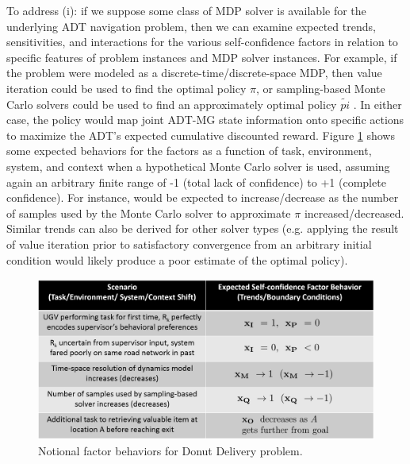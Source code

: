 To address (i): if we suppose some class of MDP solver is available for the underlying ADT navigation problem, then we can examine expected trends, sensitivities, and interactions for the various self-confidence factors in relation to specific features of problem instances and MDP solver instances. 
For example, if the problem were modeled  as a discrete-time/discrete-space MDP, then value iteration could be used to find the optimal policy $\pi$, or sampling-based Monte Carlo solvers could be used to find an approximately optimal policy $\tilde{pi}$ \cite{Browne2012-lj}. In either case, the policy would map joint ADT-MG state information onto specific actions to maximize the ADT's expected cumulative discounted reward.  
Figure \ref{fig:trendsBCs} shows some expected behaviors for the \famsec{} factors as a function of task, environment, system, and context when a hypothetical Monte Carlo solver is used, assuming again an arbitrary finite range of -1 (total lack of confidence) to +1 (complete confidence). For instance, \xQ{} would be expected to increase/decrease as the number of samples used by the Monte Carlo solver to approximate $\pi$ increased/decreased. Similar trends can also be derived for other solver types (e.g. applying the result of value iteration prior to satisfactory convergence from an arbitrary initial condition would likely produce a poor estimate of the optimal policy). %
\begin{figure}[tbp]
    \centering
    \includegraphics[width=0.65\linewidth]{Figures/scTrendsBoundaryExample_2generic.png}
    \caption{Notional \famsec{} factor behaviors for Donut Delivery problem.  }
    \label{fig:trendsBCs}
    \vspace{-0.5 cm}
\end{figure}

